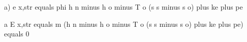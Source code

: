 a) e x,str equals phi h n minus h o minus T o (s s minus s o) plus ke plus pe

a E x,str equals m (h n minus h o minus T o (s s minus s o) plus ke plus pe) equals 0